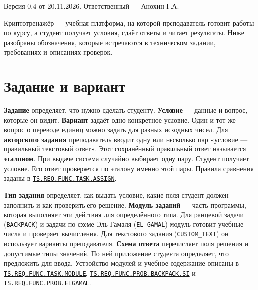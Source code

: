 \documentclass[12pt,a4paper]{article}
\begin{document}
Версия 0.4 от 20.11.2026. Ответственный --- Анохин Г.А.

Криптотренажёр --- учебная платформа, на которой преподаватель готовит работы по курсу, а студент получает условия, сдаёт ответы и читает результаты. Ниже разобраны обозначения, которые встречаются в техническом задании, требованиях и описаниях проверок.

\section{Задание и вариант}\label{ux437ux430ux434ux430ux43dux438ux435-ux438-ux432ux430ux440ux438ux430ux43dux442}

\hypertarget{задание-и-вариант}{}

\textbf{Задание} определяет, что нужно сделать студенту. \textbf{Условие} --- данные и вопрос, которые он видит. \textbf{Вариант} задаёт одно конкретное условие. Один и тот же вопрос о переводе единиц можно задать для разных исходных чисел. Для \textbf{авторского задания} преподаватель вводит одну или несколько пар «условие --- правильный текстовый ответ». Этот сохранённый правильный ответ называется \textbf{эталоном}. При выдаче система случайно выбирает одну пару. Студент получает условие. Его ответ проверяется по эталону именно этой пары. Правила сравнения заданы в {\href{../../02\_Техническое\_задание/Техническое\_задание.pdf\#ts-req-func-task-assign}{\texttt{TS.\allowbreak{}REQ.\allowbreak{}FUNC.\allowbreak{}TASK.\allowbreak{}ASSIGN}}}.

\textbf{Тип задания} определяет, как выдать условие, какие поля студент должен заполнить и как проверить его решение. \textbf{Модуль заданий} --- часть программы, которая выполняет эти действия для определённого типа. Для ранцевой задачи (\texttt{BACKPACK}) и задачи по схеме Эль-Гамаля (\texttt{EL\_GAMAL}) модуль готовит учебные числа и проверяет вычисления. Для текстового задания (\texttt{CUSTOM\_\allowbreak{}TEXT}) он использует варианты преподавателя. \textbf{Схема ответа} перечисляет поля решения и допустимые типы значений. По ней приложение студента определяет, что предложить для ввода. Устройство модулей и учебное содержание описаны в {\href{../../02\_Техническое\_задание/Техническое\_задание.pdf\#ts-req-func-task-module}{\texttt{TS.\allowbreak{}REQ.\allowbreak{}FUNC.\allowbreak{}TASK.\allowbreak{}MODULE}}}, {\href{../../02\_Техническое\_задание/Техническое\_задание.pdf\#ts-req-func-prob-backpack-si}{\texttt{TS.\allowbreak{}REQ.\allowbreak{}FUNC.\allowbreak{}PROB.\allowbreak{}BACKPACK.\allowbreak{}SI}}} и {\href{../../02\_Техническое\_задание/Техническое\_задание.pdf\#ts-req-func-prob-elgamal}{\texttt{TS.\allowbreak{}REQ.\allowbreak{}FUNC.\allowbreak{}PROB.\allowbreak{}ELGAMAL}}}.
\end{document}
